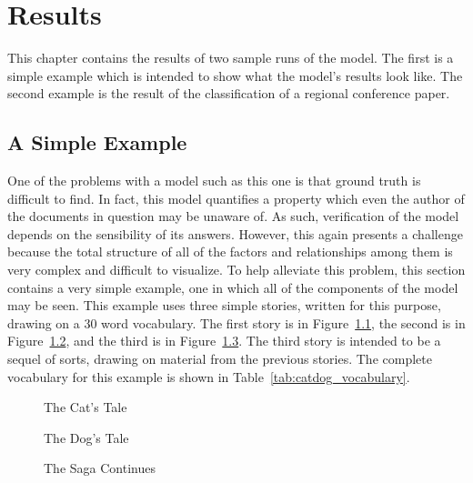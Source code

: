 \documentclass[../ut-dissertation.tex]{subfiles}
\begin{document}
\chapter{Results}
This chapter contains the results of two sample runs of the model.
The first is a simple example which is intended to show what the
model's results look like.  The second example is the result of the
classification of a regional conference paper.

\section{A Simple Example}
One of the problems with a model such as this one is that ground truth
is difficult to find.  In fact, this model quantifies a property
which even the author of the documents in question may be unaware of.
As such, verification of the model depends on the sensibility of its
answers.  However, this again presents a challenge because the total
structure of all of the factors and relationships among them is
very complex and difficult to visualize.  To help alleviate this
problem, this section contains a very simple example, one in which all
of the components of the model may be seen.  This example uses three
simple stories, written for this purpose, drawing on a 30 word
vocabulary.  The first story is in Figure~\ref{fig:cat_story}, the
second is in Figure~\ref{fig:dog_story}, and the third is in
Figure~\ref{fig:cat_dog_story}.  The third story is intended to be a
sequel of sorts, drawing on material from the previous stories.  The
complete vocabulary for this example is shown in
Table~\ref{tab:catdog_vocabulary}.
\begin{figure}[p]
  \noindent{}
  \caption{The Cat's Tale}\label{fig:cat_story}
\end{figure}

\begin{figure}[p]
  \noindent{}
  \caption{The Dog's Tale}\label{fig:dog_story}
\end{figure}

\begin{figure}[p]
  \noindent{}
  \caption{The Saga Continues}\label{fig:cat_dog_story}
\end{figure}
\end{document}
